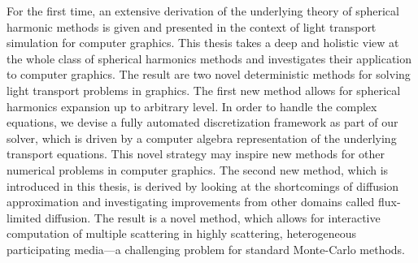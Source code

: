 For the first time, an extensive derivation of the underlying theory of spherical harmonic methods is given and presented in the context of light transport simulation for computer graphics. This thesis takes a deep and holistic view at the whole class of spherical harmonics methods and investigates their application to computer graphics. The result are two novel deterministic methods for solving light transport problems in graphics. The first new method allows for spherical harmonics expansion up to arbitrary level. In order to handle the complex equations, we devise a fully automated discretization framework as part of our solver, which is driven by a computer algebra representation of the underlying transport equations. This novel strategy may inspire new methods for other numerical problems in computer graphics. The second new method, which is introduced in this thesis, is derived by looking at the shortcomings of diffusion approximation and investigating improvements from other domains called flux-limited diffusion. The result is a novel method, which allows for interactive computation of multiple scattering in highly scattering, heterogeneous participating media---a challenging problem for standard Monte-Carlo methods.